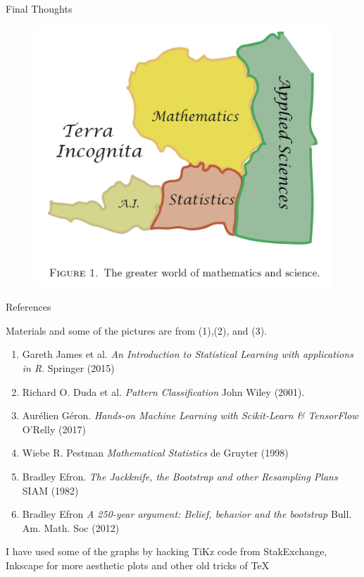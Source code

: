 \documentclass{beamer}
\begin{document}
\begin{frame}{Final Thoughts}
	
	
	\begin{figure}[h]
		\centering
		\includegraphics[scale=0.5]{../../Figures/fig_efron_paper.png}
	\end{figure}
\end{frame}
		
	\begin{frame}{References}
		
		Materials and some of the pictures are from (1),(2), and (3).
		\begin{enumerate}
			\item Gareth James et al. {\it An Introduction to Statistical Learning with applications in R}. Springer (2015)
			\item Richard O. Duda et al. {\it Pattern Classification} John Wiley (2001). 
			\item Aur\'elien G\'eron. {\it Hands-on Machine Learning with Scikit-Learn \& TensorFlow} O'Relly (2017)
			\item Wiebe R. Pestman {\it Mathematical Statistics} de Gruyter (1998)
			\item Bradley Efron. {\it The Jackknife, the Bootstrap and other Resampling Plans}  SIAM (1982)
			\item Bradley Efron {\it A 250-year argument: Belief, behavior and the bootstrap} Bull. Am. Math. Soc (2012)
		\end{enumerate}	
		
		I have used some of the graphs by hacking TiKz code from StakExchange, Inkscape for more aesthetic plots and other old tricks of \TeX
	\end{frame}	

	
\end{document}
